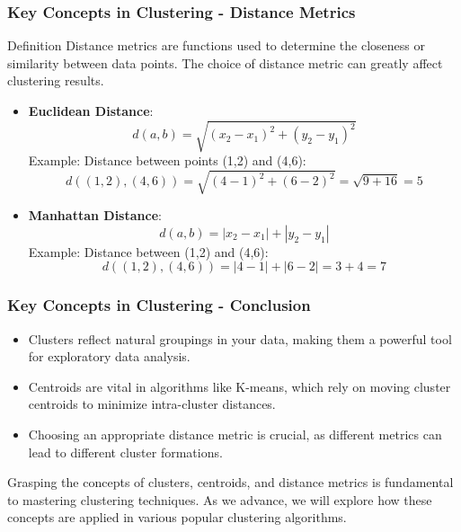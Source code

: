 \documentclass[aspectratio=169]{beamer}
\begin{document}
\begin{frame}[fragile]
    \frametitle{Key Concepts in Clustering - Distance Metrics}
    \begin{block}{Definition}
        Distance metrics are functions used to determine the closeness or similarity between data points. 
        The choice of distance metric can greatly affect clustering results.
    \end{block}

    \begin{itemize}
        \item \textbf{Euclidean Distance}:
        \begin{equation}
            d(a, b) = \sqrt{(x_2 - x_1)^2 + (y_2 - y_1)^2}
        \end{equation}
        Example: Distance between points (1,2) and (4,6):
        \begin{equation}
            d((1,2), (4,6)) = \sqrt{(4-1)^2 + (6-2)^2} = \sqrt{9 + 16} = 5
        \end{equation}
        
        \item \textbf{Manhattan Distance}:
        \begin{equation}
            d(a, b) = |x_2 - x_1| + |y_2 - y_1|
        \end{equation}
        Example: Distance between (1,2) and (4,6):
        \begin{equation}
            d((1,2), (4,6)) = |4-1| + |6-2| = 3 + 4 = 7
        \end{equation}
    \end{itemize}
\end{frame}

\begin{frame}[fragile]
    \frametitle{Key Concepts in Clustering - Conclusion}
    \begin{itemize}
        \item Clusters reflect natural groupings in your data, making them a powerful tool for exploratory data analysis.
        \item Centroids are vital in algorithms like K-means, which rely on moving cluster centroids to minimize intra-cluster distances.
        \item Choosing an appropriate distance metric is crucial, as different metrics can lead to different cluster formations.
    \end{itemize}
    
    Grasping the concepts of clusters, centroids, and distance metrics is fundamental to mastering clustering techniques.
    As we advance, we will explore how these concepts are applied in various popular clustering algorithms.
\end{frame}
\end{document}
